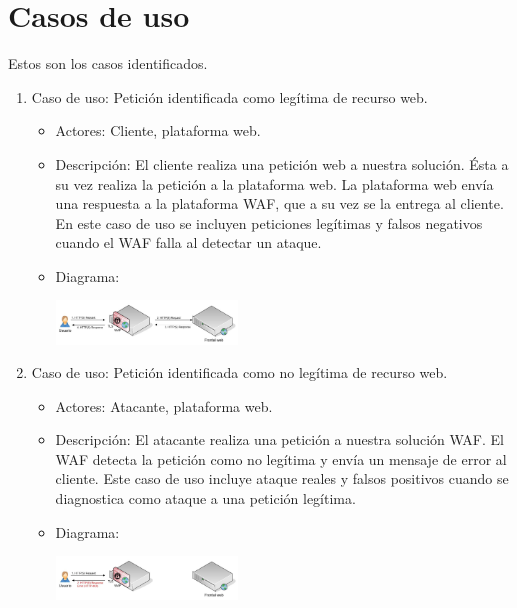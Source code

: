 \section{Casos de uso}
\par Estos son los casos identificados.
\begin{enumerate}
  \item Caso de uso: Petición identificada como legítima de recurso web.
    \begin{itemize}
      \item Actores: Cliente, plataforma web.
      \item Descripción: El cliente realiza una petición web a nuestra solución. Ésta a su vez realiza la petición a la plataforma web. La
        plataforma web envía una respuesta a la plataforma WAF, que a su vez se la entrega al cliente. En este caso de uso se incluyen peticiones
        legítimas y falsos negativos cuando el WAF falla al detectar un ataque.
      \item Diagrama:
        \begin{center}
          \label{fig:CasoUso1}
          \includegraphics[width=0.4\textwidth]{fig/UseCase1}
        \end{center}
    \end{itemize}
  \item Caso de uso: Petición identificada como no legítima de recurso web.
    \begin{itemize}
      \item Actores: \Gls{Atacante}, plataforma web.
      \item Descripción: El atacante realiza una petición a nuestra solución WAF. El WAF detecta la petición como no legítima y envía un mensaje de
        error al cliente. Este caso de uso incluye ataque reales y falsos positivos cuando se diagnostica como ataque a una petición legítima.
      \item Diagrama:
        \begin{center}
          \label{fig:CasoUsoX}
          \includegraphics[width=0.4\textwidth]{fig/UseCase2}
        \end{center}
    \end{itemize}

\end{enumerate}
